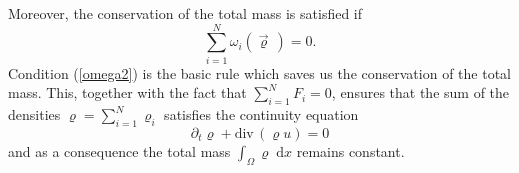 \documentclass[11pt]{article}
\newcommand{\dd}{\mathrm{d}}
\newcommand{\ddiv}{\mathrm{div\,}}
\newtheorem{rem}[tw]{Remark}
\numberwithin{equation}{section}
\numberwithin{tw}{section}
\begin{document}
Moreover, the conservation of the total mass is satisfied if 
\begin{equation}\label{omega2}
\sum_{i=1}^N\omega_i(\vec\varrho\,)=0. \end{equation}
Condition (\ref{omega2}) is the basic rule which saves us the conservation of the total mass.
This, together with the fact that $\sum_{i=1}^N F_i=0$, ensures that the sum of the densities $\varrho=\sum_{i=1}^N\varrho_i$ satisfies the continuity equation
\[ \partial_t\varrho+\ddiv(\varrho u) = 0 \]
and as a consequence the total mass $\int_\Omega \varrho \; \dd x$ remains constant.



\end{document}

